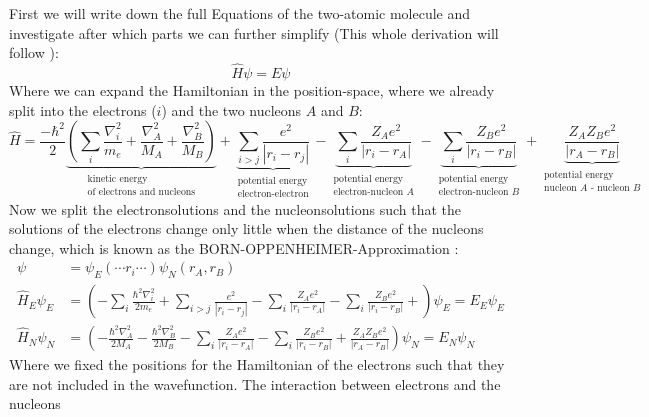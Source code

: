 First we will write down the full Equations of the two-atomic
molecule and investigate after which parts we can further
simplify (This whole derivation will follow \cite{staatsexamen}):
\begin{equation}
        \hat{H}\psi = E\psi 
\end{equation}
Where we can expand the Hamiltonian in the position-space,
where we already split into the electrons ($i$) and the 
two nucleons $A$ and $B$:
\begin{equation}
    \hat{H} = \frac{-\hbar^2}{2} 
        \underbrace{\left(
        \sum_{i}{\frac{\nabla_i^2}{m_e}}
        +\frac{\nabla_A^2}{M_A} +\frac{\nabla_B^2}{M_B}
\right)}_{
\substack{\text{kinetic energy}\\\text{of electrons and nucleons}}}
+ \underbrace{\sum_{i>j}{\frac{e^2}{|r_i - r_j|}}
    }_{\substack{\text{potential energy}\\\text{electron-electron}}}
 - \underbrace{\sum_{i}{\frac{Z_A e^2}{|r_i - r_A|}}
 }_{\substack{\text{potential energy}\\\text{electron-nucleon $A$}}}
 - \underbrace{\sum_{i}{\frac{Z_B e^2}{|r_i - r_B|}}
 }_{\substack{\text{potential energy}\\\text{electron-nucleon $B$}}}
 +  \underbrace{\frac{Z_A Z_B e^2}{|r_A - r_B|}
 }_{\substack{\text{potential energy}\\\text{nucleon $A$ - nucleon $B$}}}
\end{equation}
Now we split the electronsolutions and the nucleonsolutions such
that the solutions of the electrons change only little when the
distance of the nucleons change, which is known as the
\textsc{BORN-OPPENHEIMER}-Approximation \cite{staatsexamen}:
\begin{align}
    \psi &= \psi_E ( \cdots r_i \cdots) \psi_N(r_A, r_B) \\
    \hat{ H}_E\psi_E &= \left(- \sum_{i}{\frac{\hbar^2\nabla_i^2}{2m_e}}
    + \sum_{i>j}{\frac{e^2}{|r_i - r_j|}}
    - \sum_{i}\frac{Z_A e^2}{|r_i - r_A|}
    - \sum_{i}\frac{Z_B e^2}{|r_i - r_B|}
    + 
    \right ) \psi_E = 
 E_E \psi_E \\
 \hat{H}_N\psi_N &= \left (
 -\frac{\hbar^2\nabla_A^2}{2M_A} -\frac{\hbar^2\nabla_B^2}{2M_B}
    - \sum_{i}\frac{Z_A e^2}{|r_i - r_A|}
    - \sum_{i}\frac{Z_B e^2}{|r_i - r_B|}
 + \frac{Z_A Z_B e^2}{|r_A - r_B|}
 \right ) \psi_N
=  E_N \psi_N 
\end{align}
Where we fixed the positions for the Hamiltonian
of the electrons such that they are not included in the
wavefunction. The interaction between electrons and the nucleons
